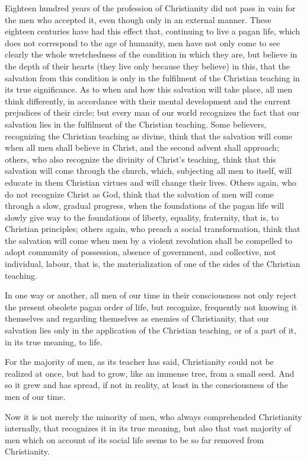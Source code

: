 \documentclass{book}
\begin{document}
Eighteen hundred years of the profession of Christianity did not pass in vain for the men who accepted it, even though only in an external manner. These eighteen centuries have had this effect that, continuing to live a pagan life, which does not correspond to the age of humanity, men have not only come to see clearly the whole wretchedness of the condition in which they are, but believe in the depth of their hearts (they live only because they believe) in this, that the salvation from this condition is only in the fulfilment of the Christian teaching in its true significance. As to when and how this salvation will take place, all men think differently, in accordance with their mental development and the current prejudices of their circle; but every man of our world recognizes the fact that our salvation lies in the fulfilment of the Christian teaching. Some believers, recognizing the Christian teaching as divine, think that the salvation will come when all men shall believe in Christ, and the second advent shall approach; others, who also recognize the divinity of Christ’s teaching, think that this salvation will come through the church, which, subjecting all men to itself, will educate in them Christian virtues and will change their lives. Others again, who do not recognize Christ as God, think that the salvation of men will come through a slow, gradual progress, when the foundations of the pagan life will slowly give way to the foundations of liberty, equality, fraternity, that is, to Christian principles; others again, who preach a social transformation, think that the salvation will come when men by a violent revolution shall be compelled to adopt community of possession, absence of government, and collective, not individual, labour, that is, the materialization of one of the sides of the Christian teaching.

In one way or another, all men of our time in their consciousness not only reject the present obsolete pagan order of life, but recognize, frequently not knowing it themselves and regarding themselves as enemies of Christianity, that our salvation lies only in the application of the Christian teaching, or of a part of it, in its true meaning, to life.

For the majority of men, as its teacher has said, Christianity could not be realized at once, but had to grow, like an immense tree, from a small seed. And so it grew and has spread, if not in reality, at least in the consciousness of the men of our time.

Now it is not merely the minority of men, who always comprehended Christianity internally, that recognizes it in its true meaning, but also that vast majority of men which on account of its social life seems to be so far removed from Christianity.
\end{document}
